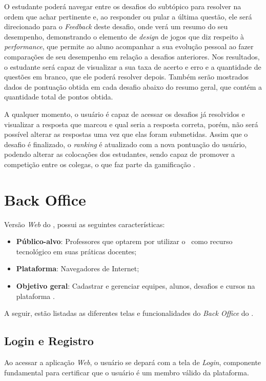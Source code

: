 
O estudante poderá navegar entre os desafios do subtópico para resolver na ordem que achar pertinente e, ao responder ou pular a última questão, ele será direcionado para o \textit{Feedback} deste desafio, onde verá um resumo do seu desempenho, demonstrando o elemento de \textit{design} de jogos que diz respeito à \textit{performance}, que permite ao aluno acompanhar a sua evolução pessoal ao fazer comparações de seu desempenho em relação a desafios anteriores. Nos resultados, o estudante será capaz de visualizar a sua taxa de acerto e erro e a quantidade de questões em branco, que ele poderá resolver depois. Também serão mostrados dados de pontuação obtida em cada desafio abaixo do resumo geral, que contém a quantidade total de pontos obtida.

A qualquer momento, o usuário é capaz de acessar os desafios já resolvidos e visualizar a resposta que marcou e qual seria a resposta correta, porém, não será possível alterar as respostas uma vez que elas foram submetidas. Assim que o desafio é finalizado, o \textit{ranking} é atualizado com a nova pontuação do usuário, podendo alterar as colocações dos estudantes, sendo capaz de promover a competição entre os colegas, o que faz parte da gamificação \cite{ranking_competition}.

\section{Back Office}
\label{backoffice}

Versão \textit{Web} do \appName, possui as seguintes características:

\begin{itemize}
    \item \textbf{Público-alvo}: Professores que optarem por utilizar o \appName\ como recurso tecnológico em suas práticas docentes;
    \item \textbf{Plataforma}: Navegadores de Internet;
    \item \textbf{Objetivo geral}: Cadastrar e gerenciar equipes, alunos, desafios e cursos na plataforma \appName .
\end{itemize}

A seguir, estão listadas as diferentes telas e funcionalidades do \textit{Back Office} do \appName.

\subsection{Login e Registro}
Ao acessar a aplicação \textit{Web}, o usuário se depará com a tela de \textit{Login}, componente fundamental para certificar que o usuário é um membro válido da plataforma.

